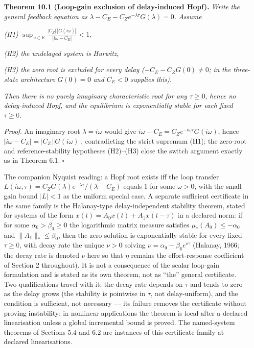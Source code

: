 \documentclass[11pt]{article}
\begin{document}
\textbf{Theorem 10.1 (Loop-gain exclusion of delay-induced Hopf).}
\emph{Write the general feedback equation as
\(\lambda - C_E - C_Z e^{-\lambda\tau}G(\lambda) = 0\). Assume}

\emph{(H1)
\(\sup_{\omega \in \mathbb{R}} \frac{|C_Z|\,|G(i\omega)|}{|i\omega - C_E|} < 1\),}

\emph{(H2) the undelayed system is Hurwitz,}

\emph{(H3) the zero root is excluded for every delay
(\(-C_E - C_Z G(0) \neq 0\); in the three-state architecture
\(G(0) = 0\) and \(C_E < 0\) supplies this).}

\emph{Then there is no purely imaginary characteristic root for any
\(\tau \ge 0\), hence no delay-induced Hopf, and the equilibrium is
exponentially stable for each fixed \(\tau \ge 0\).}

\emph{Proof.} An imaginary root \(\lambda = i\omega\) would give
\(i\omega - C_E = C_Z e^{-i\omega\tau}G(i\omega)\), hence
\(|i\omega - C_E| = |C_Z||G(i\omega)|\), contradicting the strict
supremum (H1); the zero-root and reference-stability hypotheses
(H2)--(H3) close the switch argument exactly as in Theorem 6.1. \ensuremath{\square}

The companion Nyquist reading: a Hopf root exists iff the loop transfer
\(L(i\omega, \tau) = C_Z G(\lambda)e^{-\lambda\tau}/(\lambda - C_E)\)
equals \(1\) for some \(\omega > 0\), with the small-gain bound
\(|L| < 1\) as the uniform special case. A separate sufficient
certificate in the same family is the Halanay-type delay-independent
stability theorem, stated for systems of the form
\(\dot x(t) = A_0 x(t) + A_1 x(t - \tau)\) in a declared norm: if for
some \(\alpha_0 > \beta_0 \ge 0\) the logarithmic matrix measure
satisfies \(\mu_*(A_0) \le -\alpha_0\) and \(\|A_1\|_* \le \beta_0\),
then the zero solution is exponentially stable for every fixed
\(\tau \ge 0\), with decay rate the unique \(\nu > 0\) solving
\(\nu = \alpha_0 - \beta_0 e^{\nu\tau}\) (Halanay, 1966; the decay rate
is denoted \(\nu\) here so that \(\eta\) remains the effort-response
coefficient of Section 2 throughout). It is not a consequence of the
scalar loop-gain formulation and is stated as its own theorem, not as
``the'' general certificate. Two qualifications travel with it: the
decay rate depends on \(\tau\) and tends to zero as the delay grows (the
stability is pointwise in \(\tau\), not delay-uniform), and the
condition is sufficient, not necessary --- its failure removes the
certificate without proving instability; in nonlinear applications the
theorem is local after a declared linearisation unless a global
incremental bound is proved. The named-system theorems of Sections 5.4
and 6.2 are instances of this certificate family at declared
linearisations.
\end{document}
